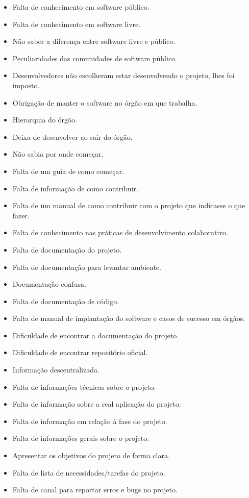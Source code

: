 \begin{itemize}
\item Falta de conhecimento em software público.
\item Falta de conhecimento em software livre.
\item Não saber a diferença entre software livre e público.
\item Peculiaridades das comunidades de software público.
%
\item Desenvolvedores não escolheram estar desenvolvendo o projeto, lhes foi imposto.
\item Obrigação de manter o software no órgão em que trabalha.
\item Hierarquia do órgão.
\item Deixa de desenvolver ao sair do órgão.
%
\item Não sabia por onde começar.
\item Falta de um guia de como começar.
\item Falta de informação de como contribuir.
\item Falta de um manual de como contribuir com o projeto que indicasse o que fazer.
\item Falta de conhecimento nas práticas de desenvolvimento colaborativo.
%
\item Falta de documentação do projeto.
\item Falta de documentação para levantar ambiente.
\item Documentação confusa.
\item Falta de documentação de código.
\item Falta de manual de implantação do software e casos de sucesso em órgãos.
\item Dificuldade de encontrar a documentação do projeto.
%
\item Dificuldade de encontrar repositório oficial.
\item Informação descentralizada.
\item Falta de informações técnicas sobre o projeto.
\item Falta de informação sobre a real aplicação do projeto.
\item Falta de informação em relação à fase do projeto.
\item Falta de informações gerais sobre o projeto.
\item Apresentar os objetivos do projeto de forma clara.
%
\item Falta de lista de necessidades/tarefas do projeto.
\item Falta de canal para reportar erros e bugs no projeto.

\end{itemize}
